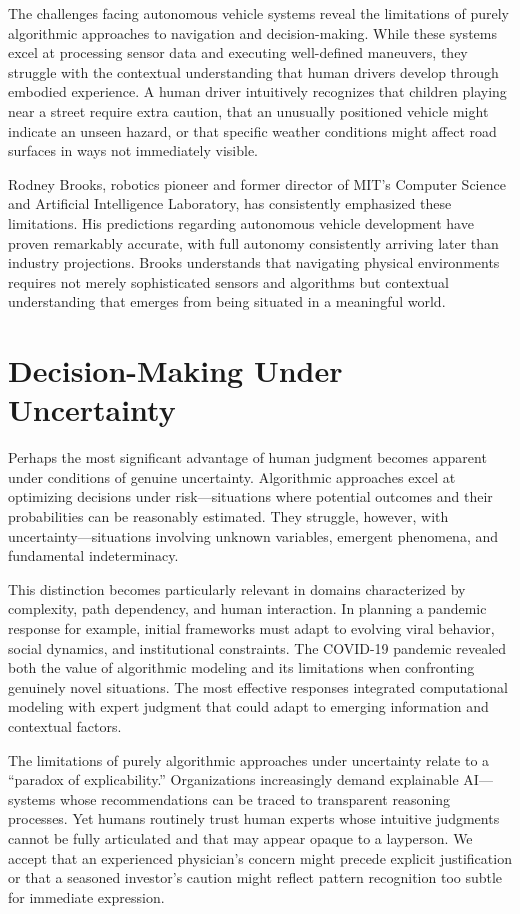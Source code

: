 \documentclass[
  Letterpaper,
]{scrbook}
\begin{document}
The challenges facing autonomous vehicle systems reveal the limitations
of purely algorithmic approaches to navigation and decision-making.
While these systems excel at processing sensor data and executing
well-defined maneuvers, they struggle with the contextual understanding
that human drivers develop through embodied experience. A human driver
intuitively recognizes that children playing near a street require extra
caution, that an unusually positioned vehicle might indicate an unseen
hazard, or that specific weather conditions might affect road surfaces
in ways not immediately visible.

Rodney Brooks, robotics pioneer and former director of MIT's Computer
Science and Artificial Intelligence Laboratory, has consistently
emphasized these limitations. His predictions regarding autonomous
vehicle development have proven remarkably accurate, with full autonomy
consistently arriving later than industry projections. Brooks
understands that navigating physical environments requires not merely
sophisticated sensors and algorithms but contextual understanding that
emerges from being situated in a meaningful world.

\section{Decision-Making Under
Uncertainty}\label{decision-making-under-uncertainty}

Perhaps the most significant advantage of human judgment becomes
apparent under conditions of genuine uncertainty. Algorithmic approaches
excel at optimizing decisions under risk---situations where potential
outcomes and their probabilities can be reasonably estimated. They
struggle, however, with uncertainty---situations involving unknown
variables, emergent phenomena, and fundamental indeterminacy.

This distinction becomes particularly relevant in domains characterized
by complexity, path dependency, and human interaction. In planning a
pandemic response for example, initial frameworks must adapt to evolving
viral behavior, social dynamics, and institutional constraints. The
COVID-19 pandemic revealed both the value of algorithmic modeling and
its limitations when confronting genuinely novel situations. The most
effective responses integrated computational modeling with expert
judgment that could adapt to emerging information and contextual
factors.

The limitations of purely algorithmic approaches under uncertainty
relate to a ``paradox of explicability.'' Organizations increasingly
demand explainable AI---systems whose recommendations can be traced to
transparent reasoning processes. Yet humans routinely trust human
experts whose intuitive judgments cannot be fully articulated and that
may appear opaque to a layperson. We accept that an experienced
physician's concern might precede explicit justification or that a
seasoned investor's caution might reflect pattern recognition too subtle
for immediate expression.
\end{document}
